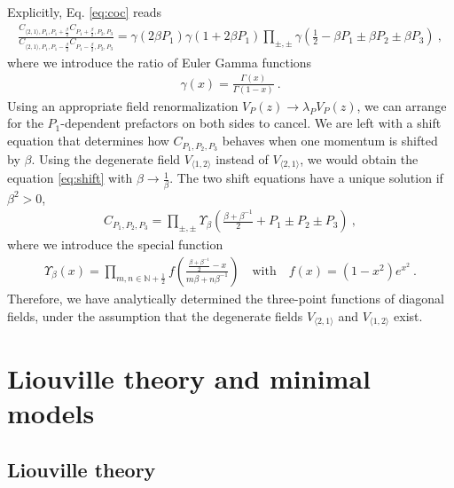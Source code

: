\documentclass[12pt, a4paper]{article}
\theoremstyle{break}
\begin{document}
Explicitly, Eq. \eqref{eq:coc} reads
\begin{align}
 \frac{C_{\langle 2,1\rangle, P_1, P_1+\frac{\beta}{2}} C_{P_1+\frac{\beta}{2},P_2,P_3}}{C_{\langle 2,1\rangle, P_1, P_1-\frac{\beta}{2}} C_{P_1-\frac{\beta}{2},P_2,P_3} } 
 =\gamma(2\beta P_1) \gamma(1+2\beta P_1)\prod_{\pm,\pm} \gamma(\tfrac12 -\beta P_1 \pm \beta P_2 \pm \beta P_3)\ ,
 \label{eq:shift}
\end{align}
where we introduce the ratio of Euler Gamma functions
\begin{align}
 \gamma(x) = \frac{\Gamma(x)}{\Gamma(1-x)}\ .
\label{gx}
\end{align}
Using an appropriate field renormalization $V_P(z)\to \lambda_PV_P(z)$, we can arrange for the $P_1$-dependent prefactors on both sides to cancel. We are left with a shift equation that determines how $C_{P_1,P_2,P_3}$ behaves when one momentum is shifted by $\beta$. Using the degenerate field $V_{\langle 1,2\rangle}$ instead of $V_{\langle 2,1\rangle}$, we would obtain the equation \eqref{eq:shift} with $\beta\to \frac{1}{\beta}$. The two shift equations have a unique solution if $\beta^2>0$, 
\begin{align}
 C_{P_1,P_2,P_3} = \prod_{\pm,\pm} \Upsilon_\beta\left(\tfrac{\beta+\beta^{-1}}{2}+P_1\pm P_2 \pm P_3\right) \ ,
 \label{cppp}
\end{align}
where we introduce the special function 
\begin{align}
 \Upsilon_\beta(x) = \prod_{m,n\in\mathbb{N}+\frac12} f\left(\frac{\frac{\beta+\beta^{-1}}{2}-x}{m\beta +n\beta^{-1}}\right) \quad \text{with} \quad f(x)=(1-x^2)e^{x^2}\ .
 \label{eq:up}
\end{align}
Therefore, we have analytically determined the three-point functions of diagonal fields, under the assumption that the degenerate fields $V_{\langle 2,1\rangle}$ and $V_{\langle 1,2\rangle}$ exist.

\section{Liouville theory and minimal models}

\subsection{Liouville theory}
\end{document}
